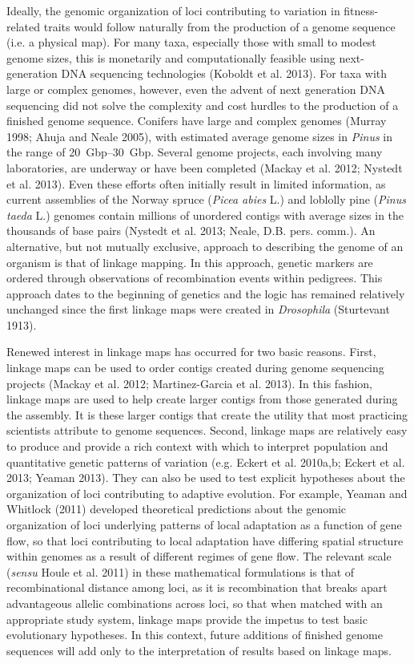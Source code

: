 \documentclass[11pt]{article}
\begin{document}
Ideally, the genomic organization of loci contributing to variation in fitness-related traits would follow 
naturally from the production of a genome sequence (i.e. a physical map). For many taxa, especially those with 
small to modest genome sizes, this is monetarily and computationally feasible using next-generation DNA sequencing 
technologies (Koboldt et al. 2013). For taxa with large or complex genomes, however, even the advent of next generation DNA 
sequencing did not solve the complexity and cost hurdles to the production of a finished genome sequence. Conifers have large and 
complex genomes (Murray 1998; Ahuja and Neale 2005), with estimated average genome sizes in \textit{Pinus} in the 
range of \SIrange{20}{30}{Gbp}. Several genome projects, each involving many laboratories, are underway or have been 
completed (Mackay et al. 2012; Nystedt et al. 2013). Even these efforts often initially result in limited information, 
as current assemblies of the Norway spruce (\textit{Picea abies} L.) and loblolly pine (\textit{Pinus taeda} L.) genomes 
contain millions of unordered contigs with average sizes in the thousands of base pairs (Nystedt et al. 2013; 
Neale, D.B. pers. comm.). An alternative, but not mutually exclusive, approach to describing the genome of an organism 
is that of linkage mapping. In this approach, genetic markers are ordered through observations of recombination events 
within pedigrees. This approach dates to the beginning of genetics and the logic has remained relatively unchanged 
since the first linkage maps were created in \textit{Drosophila} (Sturtevant 1913).

Renewed interest in linkage maps has occurred for two basic reasons. First, linkage maps can be used to order contigs 
created during genome sequencing projects (Mackay et al. 2012; Martinez-Garcia et al. 2013). In this fashion, linkage 
maps are used to help create larger contigs from those generated during the assembly. It is these larger contigs that 
create the utility that most practicing scientists attribute to genome sequences. Second, linkage maps are relatively 
easy to produce and provide a rich context with which to interpret population and quantitative genetic patterns of variation 
(e.g. Eckert et al. 2010a,b; Eckert et al. 2013; Yeaman 2013). They can also be used to test explicit hypotheses about 
the organization of loci contributing to adaptive evolution. For example, Yeaman and Whitlock (2011) developed theoretical 
predictions about the genomic organization of loci underlying patterns of local adaptation as a function of gene flow, 
so that loci contributing to local adaptation have differing spatial structure within genomes as a result of different 
regimes of gene flow. The relevant scale (\textit{sensu} Houle et al. 2011) in these mathematical formulations is that 
of recombinational distance among loci, as it is recombination that breaks apart advantageous allelic combinations across 
loci, so that when matched with an appropriate study system, linkage maps provide the impetus to test basic evolutionary 
hypotheses. In this context, future additions of finished genome sequences will add only to the interpretation of 
results based on linkage maps.
\end{document}

